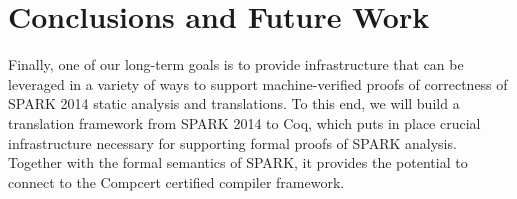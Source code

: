 \section{Conclusions and Future Work}
\label{sec:conclusion}



Finally, one of our long-term goals is to provide infrastructure that can be
leveraged in a variety of ways to support machine-verified proofs of
correctness of SPARK 2014 static analysis and
translations. To this end, we will build a translation framework
from SPARK 2014 to Coq, which puts in place crucial infrastructure
necessary for supporting formal proofs of SPARK analysis. Together
with the formal semantics of SPARK, it provides the potential to
connect to the Compcert \cite{Leroy:09} certified compiler framework.
